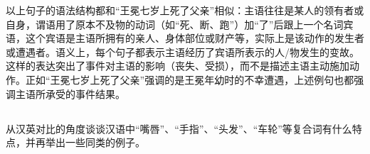 \documentclass[10pt]{ctexart}
\begin{document}
\begin{enumerate}
    以上句子的语法结构都和``王冕七岁上死了父亲''相似：主语往往是某人的领有者或自身，谓语用了原本不及物的动词（如``死、断、跑''）加``了''后跟上一个名词宾语，这个宾语是主语所拥有的亲人、身体部位或财产等，实际上是该动作的发生者或遭遇者。语义上，每个句子都表示主语经历了宾语所表示的人/物发生的变故。这样的表达突出了事件对主语的影响（丧失、受损），而不是描述主语主动施加动作。正如``王冕七岁上死了父亲''强调的是王冕年幼时的不幸遭遇，上述例句也都强调主语所承受的事件结果。
\end{enumerate}


\subsection{}
{\heiti
从汉英对比的角度谈谈汉语中``嘴唇''、``手指''、``头发''、``车轮''等复合词有什么特点，并再举出一些同类的例子。}

\vspace{0.5cm}
\end{document}
